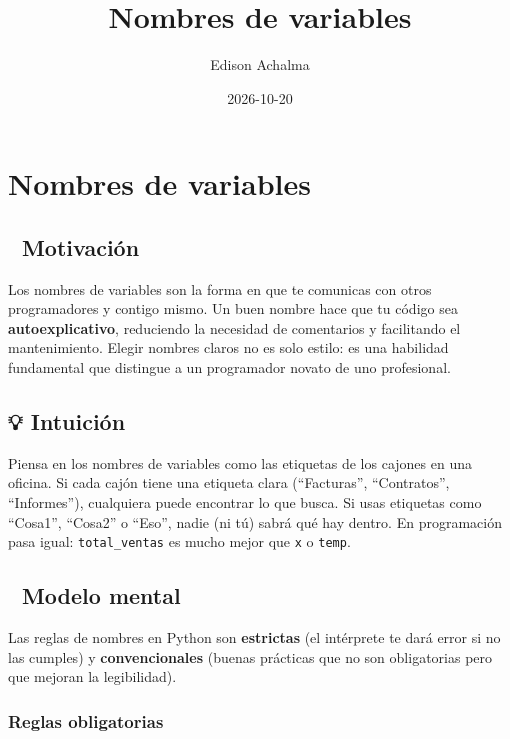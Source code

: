 \documentclass[
  doc,
  floatsintext,
  longtable,
  a4paper,
  nolmodern,
  notxfonts,
  notimes,
  12pt,
  colorlinks=true,linkcolor=blue,citecolor=blue,urlcolor=blue]{apa7}
\title{Nombres de variables}
\author{Edison Achalma}
\affiliation{
{Escuela Profesional de Economía, Universidad Nacional de San Cristóbal
de Huamanga}}
\date{2026-10-20}
\begin{document}
\maketitle


\hypertarget{toc}{}
\tableofcontents
\newpage
\section[Introduction]{Nombres de variables}

\setcounter{secnumdepth}{3}

\setlength\LTleft{0pt}




\subsection{🎯 Motivación}\label{motivaciuxf3n}

Los nombres de variables son la forma en que te comunicas con otros
programadores y contigo mismo. Un buen nombre hace que tu código sea
\textbf{autoexplicativo}, reduciendo la necesidad de comentarios y
facilitando el mantenimiento. Elegir nombres claros no es solo estilo:
es una habilidad fundamental que distingue a un programador novato de
uno profesional.

\subsection{💡 Intuición}\label{intuiciuxf3n}

Piensa en los nombres de variables como las etiquetas de los cajones en
una oficina. Si cada cajón tiene una etiqueta clara (``Facturas'',
``Contratos'', ``Informes''), cualquiera puede encontrar lo que busca.
Si usas etiquetas como ``Cosa1'', ``Cosa2'' o ``Eso'', nadie (ni tú)
sabrá qué hay dentro. En programación pasa igual: \texttt{total\_ventas}
es mucho mejor que \texttt{x} o \texttt{temp}.

\subsection{🧠 Modelo mental}\label{modelo-mental}

Las reglas de nombres en Python son \textbf{estrictas} (el intérprete te
dará error si no las cumples) y \textbf{convencionales} (buenas
prácticas que no son obligatorias pero que mejoran la legibilidad).

\subsubsection{Reglas obligatorias}\label{reglas-obligatorias}
\end{document}
